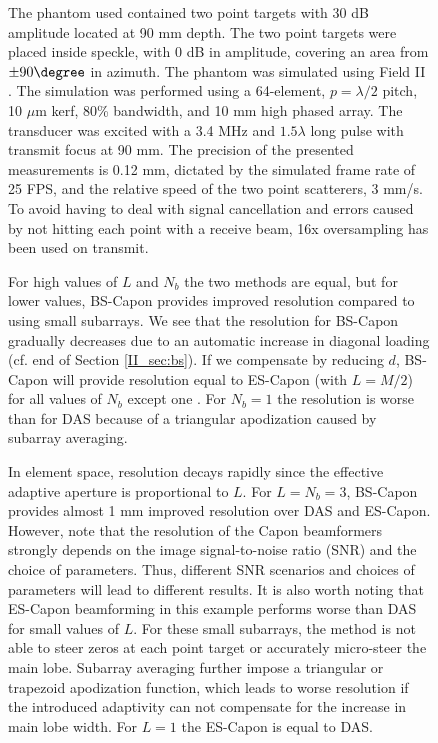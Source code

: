 \begin{figure}[!t]
The phantom used contained two point targets with 30 dB amplitude located at 90 mm depth. The two point targets were placed inside speckle, with 0 dB in amplitude, covering an area from $\pm90\degree$ in azimuth. The phantom was simulated using Field II \cite{Jensen1992, Jensen1996a}. The simulation was performed using a 64-element, $p=\lambda/2$ pitch, 10 $\mu$m kerf, 80\% bandwidth, and 10 mm high phased array. The transducer was excited with a 3.4 MHz and $1.5\lambda$ long pulse with transmit focus at 90 mm. The precision of the presented measurements is 0.12 mm, dictated by the simulated frame rate of 25 FPS, and the relative speed of the two point scatterers, 3 mm/s. To avoid having to deal with signal cancellation and errors caused by not hitting each point with a receive beam, 16x oversampling has been used on transmit. 

For high values of $L$ and $N_b$ the two methods are equal, but for lower values, BS-Capon provides improved resolution compared to using small subarrays. We see that the resolution for BS-Capon gradually decreases due to an automatic increase in diagonal loading (cf. end of Section \ref{II_sec:bs}). If we compensate by reducing $d$, BS-Capon will provide resolution equal to ES-Capon (with $L=M/2$) for all values of $N_b$ except one \cite{Nilsen2009}. For $N_b=1$ the resolution is worse than for DAS because of a triangular apodization caused by subarray averaging. 

In element space, resolution decays rapidly since the effective adaptive aperture is proportional to $L$. For $L = N_b=3$, BS-Capon provides almost 1 mm improved resolution over DAS and ES-Capon. However, note that the resolution of the Capon beamformers strongly depends on the image signal-to-noise ratio (SNR) and the choice of parameters. Thus, different SNR scenarios and choices of parameters will lead to different results. It is also worth noting that ES-Capon beamforming in this example performs worse than DAS for small values of $L$. For these small subarrays, the method is not able to steer zeros at each point target or accurately micro-steer the main lobe. Subarray averaging further impose a triangular or trapezoid apodization function, which leads to worse resolution if the introduced adaptivity can not compensate for the increase in main lobe width. For $L=1$ the ES-Capon is equal to DAS.


\end{figure}
